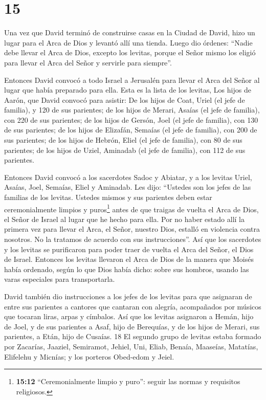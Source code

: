 \hypertarget{section-14}{%
\section{15}\label{section-14}}

 Una vez que David terminó de construirse casas en la Ciudad
de David, hizo un lugar para el Arca de Dios y levantó allí una tienda.
 Luego dio órdenes: ``Nadie debe llevar el Arca de Dios,
excepto los levitas, porque el Señor mismo los eligió para llevar el
Arca del Señor y servirle para siempre''.

 Entonces David convocó a todo Israel a Jerusalén para
llevar el Arca del Señor al lugar que había preparado para ella.
 Esta es la lista de los levitas, Los hijos de Aarón, que
David convocó para asistir:  De los hijos de Coat, Uriel (el
jefe de familia), y 120 de sus parientes;  de los hijos de
Merari, Asaías (el jefe de familia), con 220 de sus parientes;
 de los hijos de Gersón, Joel (el jefe de familia), con 130
de sus parientes;  de los hijos de Elizafán, Semaías (el
jefe de familia), con 200 de sus parientes;  de los hijos de
Hebrón, Eliel (el jefe de familia), con 80 de sus parientes;
 de los hijos de Uziel, Aminadab (el jefe de familia), con
112 de sus parientes.

 Entonces David convocó a los sacerdotes Sadoc y Abiatar, y
a los levitas Uriel, Asaías, Joel, Semaías, Eliel y Aminadab.
 Les dijo: ``Ustedes son los jefes de las familias de los
levitas. Ustedes mismos y sus parientes deben estar ceremonialmente
limpios y puros\footnote{\textbf{15:12} ``Ceremonialmente limpio y
  puro'': seguir las normas y requisitos religiosos.} antes de que
traigas de vuelta el Arca de Dios, el Señor de Israel al lugar que he
hecho para ella.  Por no haber estado allí la primera vez
para llevar el Arca, el Señor, nuestro Dios, estalló en violencia contra
nosotros. No la tratamos de acuerdo con sus instrucciones''.
 Así que los sacerdotes y los levitas se purificaron para
poder traer de vuelta el Arca del Señor, el Dios de Israel.
 Entonces los levitas llevaron el Arca de Dios de la manera
que Moisés había ordenado, según lo que Dios había dicho: sobre sus
hombros, usando las varas especiales para transportarla.

 David también dio instrucciones a los jefes de los levitas
para que asignaran de entre sus parientes a cantores que cantaran con
alegría, acompañados por músicos que tocaran liras, arpas y címbalos.
 Así que los levitas asignaron a Hemán, hijo de Joel, y de
sus parientes a Asaf, hijo de Berequías, y de los hijos de Merari, sus
parientes, a Etán, hijo de Cusaías. 18 El segundo grupo de levitas
estaba formado por Zacarías, Jaaziel, Semiramot, Jehiel, Uni, Eliab,
Benaía, Maaseías, Matatías, Elifelehu y Micnías; y los porteros
Obed-edom y Jeiel.

